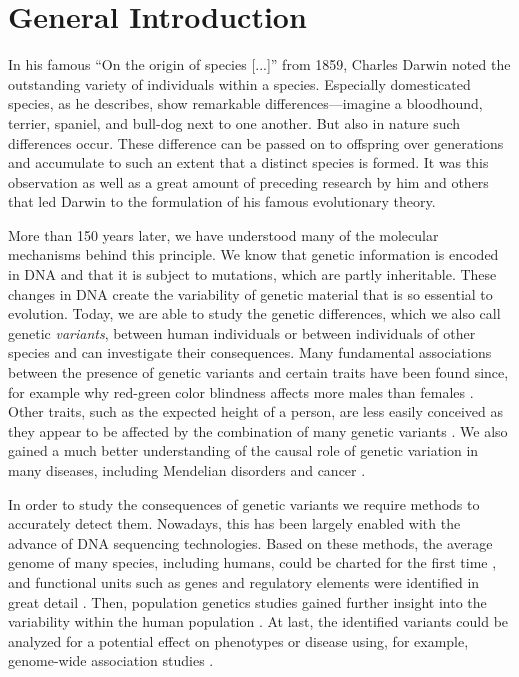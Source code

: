 \chapter{General Introduction}
\label{sec:intro}

In his famous ``On the origin of species [...]'' from 1859, Charles Darwin noted
the outstanding variety of individuals within a species. Especially domesticated
species, as he describes, show remarkable differences---imagine a bloodhound,
terrier, spaniel, and bull-dog next to one another. But also in nature such
differences occur. These difference can be passed on to offspring over
generations and accumulate to such an extent that a distinct species is formed.
It was this observation as well as a great amount of preceding research by him
and others that led Darwin to the formulation of his famous evolutionary theory.

More than 150 years later, we have understood many of the molecular mechanisms
behind this principle. We know that genetic information is encoded in DNA and
that it is subject to mutations, which are partly inheritable. These changes in
DNA create the variability of genetic material that is so essential to
evolution. Today, we are able to study the genetic differences,
which we also call genetic \emph{variants},
between human individuals or between individuals of other species and can investigate
their consequences. Many fundamental associations between the presence of
genetic variants and certain traits have been found since, for example why
red-green color blindness affects more males than females \citep{Nathans1986}.
Other traits, such as the expected height of a person, are less easily conceived
as they appear to be affected by the combination of many genetic variants
\citep{Wood2014,Marouli2017}. We also gained a much better understanding of the
causal role of genetic variation in many diseases, including Mendelian disorders
and cancer \citep{Stankiewicz2010}.

In order to study the consequences of genetic variants we require
methods to accurately detect them. Nowadays, this has been largely enabled with
the advance of DNA sequencing technologies. Based on these methods, the average
genome of many species, including humans, could be charted for the first time
\citep{Lander2001,Venter2001}, and functional units such as genes and regulatory
elements were identified in great detail \citep{Dunham2012}. Then, population
genetics studies gained further insight into the variability within the human
population \citep{Auton2015,Sudmant2015}.
At last, the identified variants could be analyzed for a potential effect on
phenotypes or disease using, for example, genome-wide association studies
\citep{Ott2015,MacArthur2017}.

